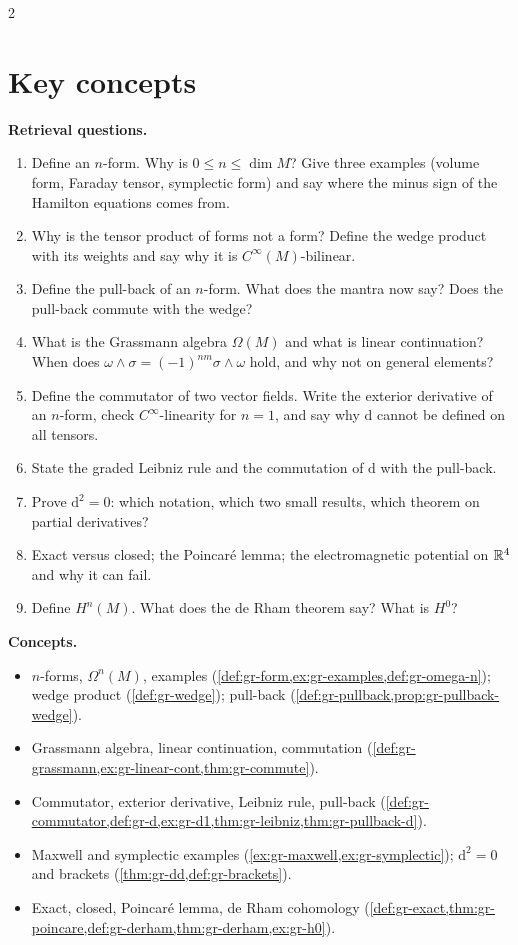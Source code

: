 \begin{paracol}{2}
\section*{Key concepts}
\begin{keyconcepts}
\textbf{Retrieval questions.}
\begin{enumerate}
  \item Define an $n$-form. Why is $0\le n\le\dim M$? Give three examples (volume form, Faraday tensor, symplectic form) and say where the minus sign of the Hamilton equations comes from.
  \item Why is the tensor product of forms not a form? Define the wedge product with its weights and say why it is $C^\infty(M)$-bilinear.
  \item Define the pull-back of an $n$-form. What does the mantra now say? Does the pull-back commute with the wedge?
  \item What is the Grassmann algebra $\Omega(M)$ and what is linear continuation? When does $\omega\wedge\sigma=(-1)^{nm}\sigma\wedge\omega$ hold, and why not on general elements?
  \item Define the commutator of two vector fields. Write the exterior derivative of an $n$-form, check $C^\infty$-linearity for $n=1$, and say why $\mathrm d$ cannot be defined on all tensors.
  \item State the graded Leibniz rule and the commutation of $\mathrm d$ with the pull-back.
  \item Prove $\mathrm d^2=0$: which notation, which two small results, which theorem on partial derivatives?
  \item Exact versus closed; the Poincar\'e lemma; the electromagnetic potential on $\mathbb{R}^4$ and why it can fail.
  \item Define $H^n(M)$. What does the de Rham theorem say? What is $H^0$?
\end{enumerate}
\textbf{Concepts.}
\begin{itemize}
  \item $n$-forms, $\Omega^n(M)$, examples (\cref{def:gr-form,ex:gr-examples,def:gr-omega-n}); wedge product (\cref{def:gr-wedge}); pull-back (\cref{def:gr-pullback,prop:gr-pullback-wedge}).
  \item Grassmann algebra, linear continuation, commutation (\cref{def:gr-grassmann,ex:gr-linear-cont,thm:gr-commute}).
  \item Commutator, exterior derivative, Leibniz rule, pull-back (\cref{def:gr-commutator,def:gr-d,ex:gr-d1,thm:gr-leibniz,thm:gr-pullback-d}).
  \item Maxwell and symplectic examples (\cref{ex:gr-maxwell,ex:gr-symplectic}); $\mathrm d^2=0$ and brackets (\cref{thm:gr-dd,def:gr-brackets}).
  \item Exact, closed, Poincar\'e lemma, de Rham cohomology (\cref{def:gr-exact,thm:gr-poincare,def:gr-derham,thm:gr-derham,ex:gr-h0}).
\end{itemize}
\end{keyconcepts}

\flushside
\end{paracol}
